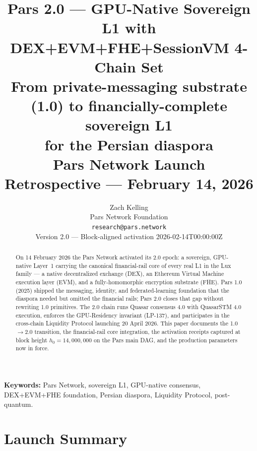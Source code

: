 \documentclass[11pt,a4paper]{article}
\title{%
    \textbf{Pars 2.0 --- GPU-Native Sovereign L1 with DEX+EVM+FHE+SessionVM 4-Chain Set}\\[0.5em]
    \large From private-messaging substrate (1.0) to financially-complete sovereign L1\\
    for the Persian diaspora\\[0.4em]
    \normalsize Pars Network Launch Retrospective --- February 14, 2026
}
\author{%
    Zach Kelling\\
    Pars Network Foundation\\
    \texttt{research@pars.network}\\[0.4em]
    \small Version 2.0 --- Block-aligned activation 2026-02-14T00:00:00Z
}
\date{}
\begin{document}
\parscoverpage

\begin{abstract}
On 14 February 2026 the Pars Network activated its 2.0 epoch: a sovereign,
GPU-native Layer~1 carrying the canonical financial-rail core of every real
L1 in the Lux family --- a native decentralized exchange (DEX), an
Ethereum Virtual Machine execution layer (EVM), and a fully-homomorphic
encryption substrate (FHE). Pars 1.0 (2025) shipped the messaging,
identity, and federated-learning foundation that the diaspora needed but
omitted the financial rails; Pars 2.0 closes that gap without rewriting
1.0 primitives. The 2.0 chain runs Quasar consensus 4.0 with QuasarSTM
4.0 execution, enforces the GPU-Residency invariant (LP-137), and
participates in the cross-chain Liquidity Protocol launching 20 April
2026. This paper documents the 1.0$\to$2.0 transition, the financial-rail core
integration, the activation receipts captured at block height
$h_0 = 14{,}000{,}000$ on the Pars main DAG, and the production
parameters now in force.
\end{abstract}

\noindent\textbf{Keywords:} Pars Network, sovereign L1, GPU-native consensus,
DEX+EVM+FHE foundation, Persian diaspora, Liquidity Protocol, post-quantum.

\tableofcontents
\newpage

\section{Launch Summary}
\label{sec:launch}
\end{document}
